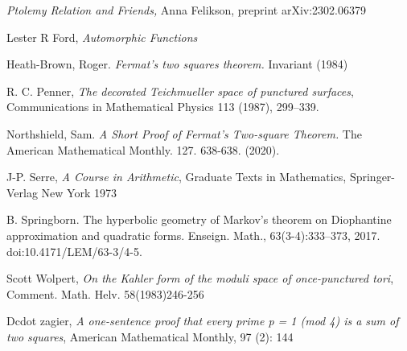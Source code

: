 \documentclass[12pt,a4paper]{amsart}
\begin{document}
\textit{Ptolemy Relation and Friends,}
Anna Felikson,
preprint arXiv:2302.06379

Lester R Ford,
\textit{Automorphic Functions}

Heath-Brown, Roger. 
\textit{ Fermat’s two squares theorem.} Invariant (1984) 



R. C. Penner, 
\textit{The decorated Teichmueller space of punctured surfaces}, 
Communications in Mathematical Physics 113 (1987), 299–339.


Northshield, Sam. 
\textit{A Short Proof of Fermat’s Two-square Theorem.} The American Mathematical Monthly. 127. 638-638. (2020). 

J-P. Serre,
\textit{A Course in Arithmetic},
Graduate Texts in Mathematics,
Springer-Verlag New York
1973

B. Springborn. The hyperbolic geometry of Markov's theorem on
Diophantine approximation and quadratic forms. Enseign. Math.,
63(3-4):333--373, 2017. doi:10.4171/LEM/63-3/4-5.

Scott Wolpert,
\textit{On the Kahler form of the moduli space of once-punctured tori}, 
Comment. Math. Helv. 58(1983)246-256

Dcdot zagier,
 \textit{A one-sentence proof that every prime p = 1 (mod 4) is a sum of two squares}, 
 American Mathematical Monthly, 97 (2): 144
 
 




%
%
%
%
%
%
%
%
\end{document}
